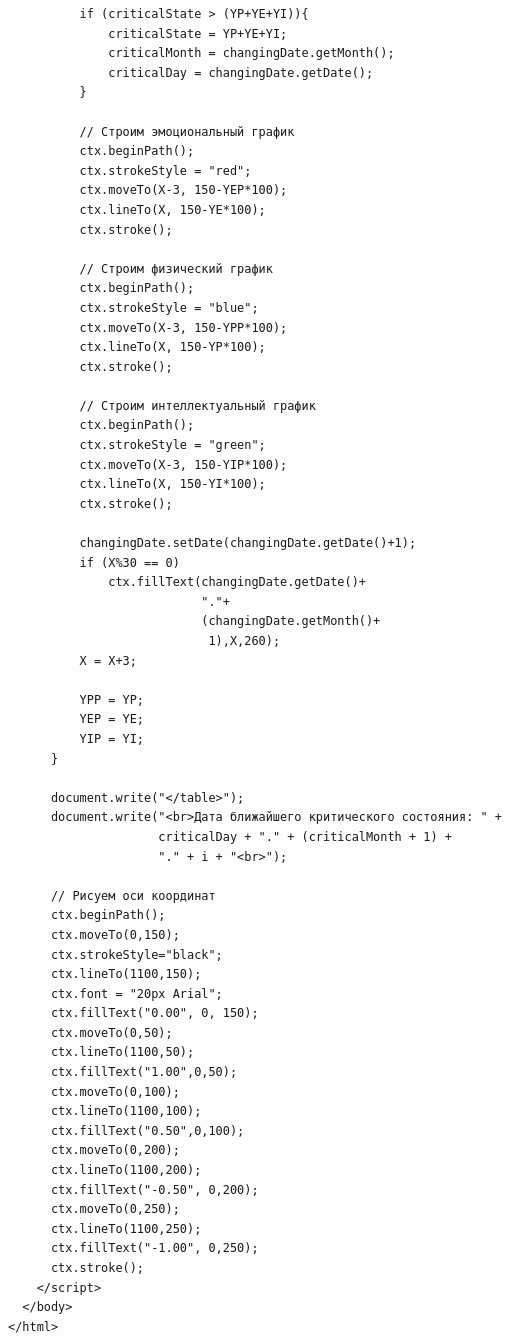 \begin{verbatim}
          if (criticalState > (YP+YE+YI)){
              criticalState = YP+YE+YI;
              criticalMonth = changingDate.getMonth();
              criticalDay = changingDate.getDate();
          }
          
          // Строим эмоциональный график
          ctx.beginPath();
          ctx.strokeStyle = "red";
          ctx.moveTo(X-3, 150-YEP*100);
          ctx.lineTo(X, 150-YE*100);
          ctx.stroke();
          
          // Строим физический график
          ctx.beginPath();
          ctx.strokeStyle = "blue";
          ctx.moveTo(X-3, 150-YPP*100);
          ctx.lineTo(X, 150-YP*100);
          ctx.stroke();
          
          // Строим интеллектуальный график
          ctx.beginPath();
          ctx.strokeStyle = "green";
          ctx.moveTo(X-3, 150-YIP*100);
          ctx.lineTo(X, 150-YI*100);
          ctx.stroke();
          
          changingDate.setDate(changingDate.getDate()+1);
          if (X%30 == 0)
              ctx.fillText(changingDate.getDate()+
                           "."+
                           (changingDate.getMonth()+
                            1),X,260);
          X = X+3;
          
          YPP = YP;
          YEP = YE;
          YIP = YI;
      }
      
      document.write("</table>");
      document.write("<br>Дата ближайшего критического состояния: " +
                     criticalDay + "." + (criticalMonth + 1) +
                     "." + i + "<br>");
      
      // Рисуем оси координат
      ctx.beginPath();
      ctx.moveTo(0,150);
      ctx.strokeStyle="black";
      ctx.lineTo(1100,150);
      ctx.font = "20px Arial";
      ctx.fillText("0.00", 0, 150);
      ctx.moveTo(0,50);
      ctx.lineTo(1100,50);
      ctx.fillText("1.00",0,50);
      ctx.moveTo(0,100);
      ctx.lineTo(1100,100);
      ctx.fillText("0.50",0,100);
      ctx.moveTo(0,200);
      ctx.lineTo(1100,200);
      ctx.fillText("-0.50", 0,200);
      ctx.moveTo(0,250);
      ctx.lineTo(1100,250);
      ctx.fillText("-1.00", 0,250);
      ctx.stroke();
    </script>
  </body>
</html>
\end{verbatim}
